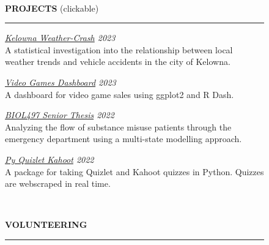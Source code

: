 \documentclass[11pt, a4paper]{article}
\begin{document}
\begin{figure}[H]
\begin{minipage}[t]{0.7\textwidth}

\par

\phantom{3pt} \\

\par

\textbf{\large{PROJECTS}} \hfill (clickable)
\par\noindent\rule{\textwidth}{1.0pt}
\par
\vspace{0.5pc}

\textit{\href{https://jonahedmundson.github.io/kelowna_weathercrash/}{Kelowna Weather-Crash} \hfill 2023} \\
A statistical investigation into the relationship between local weather trends and vehicle accidents in the city of Kelowna. 

\vspace{1.5pc}

\textit{\href{https://jonahedmundson.github.io/VGsalesDashboard_R/}{Video Games Dashboard} \hfill 2023} \\
A dashboard for video game sales using ggplot2 and R Dash. 

\vspace{1.5pc}

\textit{\href{https://www.jonahedmundson.xyz/edmundson\_finalsubmission.pdf}{BIOL497 Senior Thesis} \hfill 2022} \\ 
Analyzing the flow of substance misuse patients through the emergency department using a multi-state modelling approach.

\vspace{1.5pc}

\textit{\href{https://github.com/jonahedmundson/py\_quizlet\_cram}{Py Quizlet Kahoot} \hfill 2022} \\
A package for taking Quizlet and Kahoot quizzes in Python. Quizzes are webscraped in real time.




\par

\phantom{3pt} \\

\par

\textbf{\large{VOLUNTEERING}}
\par\noindent\rule{\textwidth}{1.0pt}
\par
\vspace{0.5pc}


\end{minipage}
\end{figure}
\end{document}
